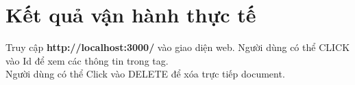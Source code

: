 \headerandfooterconfig

\chapter{Kết quả vận hành thực tế}
\label{ref{fig5_3}}
Truy cập \textbf{http://localhost:3000/} vào giao diện web.
\label{ref{fig5_1}}
Người dùng có thể CLICK vào Id để xem các thông tin trong tag.\\
Người dùng có thể Click vào DELETE để xóa trực tiếp document.\\
\label{ref{fig5_2}}